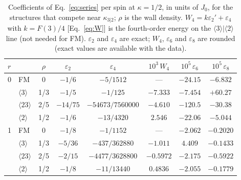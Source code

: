 \documentclass[
 aps,prb,
 twocolumn,
 superscriptaddress,
 longbibliography,
 nofootinbib,
 floatfix
]{revtex4-2}
\begin{document}
\begin{table}
\caption{Coefficients of Eq.~\eqref{eq:series} per spin at $\kappa=1/2$, in units of $J_0$, for the
structures that compete near $\kappa_{3|2}$; $\rho$ is the wall density. $W_4=k\varepsilon_2'+\varepsilon_4$
with $k=F(3)/4$ [Eq.~\eqref{eq:W}] is the fourth-order energy on the $\langle3\rangle|\langle2\rangle$ line
(not needed for FM). $\varepsilon_2$ and $\varepsilon_4$ are exact; $W_4$, $\varepsilon_6$ and $\varepsilon_8$
are rounded (exact values are available with the data).}
\label{tab:eps}
\footnotesize
\begin{ruledtabular}
\begin{tabular}{llcccccc}
$r$ & & $\rho$ & $\varepsilon_2$ & $\varepsilon_4$ & $10^3\,W_4$ & $10^5\,\varepsilon_6$ & $10^5\,\varepsilon_8$ \\
\hline
0 & FM                    & 0   & $-1/6$ & $-5/1512$            & ---      & $-24.15$ & $-6.832$ \\
  & $\langle3\rangle$     & 1/3 & $-1/5$ & $-1/125$             & $-7.333$ & $-7.454$ & $+60.27$ \\
  & $\langle23\rangle$    & 2/5 & $-14/75$ & $-54673/7560000$     & $-4.610$ & $-120.5$ & $-30.38$ \\
  & $\langle2\rangle$     & 1/2 & $-1/6$ & $-13/4320$           & $2.546$  & $-22.06$ & $-5.044$ \\
1 & FM                    & 0   & $-1/8$ & $-1/1152$            & ---      & $-2.062$ & $-0.2020$ \\
  & $\langle3\rangle$     & 1/3 & $-5/36$ & $-437/362880$        & $-1.011$ & $4.409$  & $-0.1433$ \\
  & $\langle23\rangle$    & 2/5 & $-2/15$ & $-4477/3628800$      & $-0.5972$ & $-2.175$ & $-0.5922$ \\
  & $\langle2\rangle$     & 1/2 & $-1/8$ & $-11/13440$          & $0.4836$ & $-2.055$ & $-0.1779$ \\
\end{tabular}
\end{ruledtabular}
\end{table}
\end{document}
